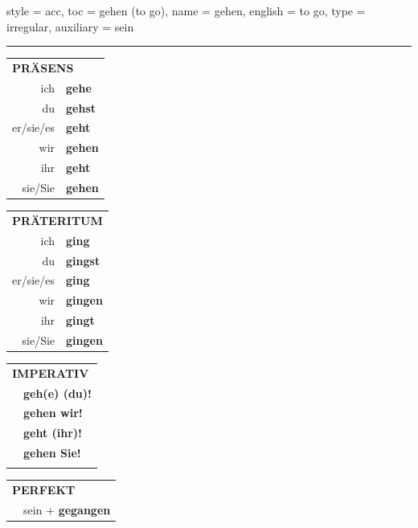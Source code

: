 \begin{verbentry}{
  style = {acc},
  toc = {gehen (to go)},
  name = {gehen},
  english = {to go},
  type = {irregular},
  auxiliary = {sein}
}
 
    
     \vspace{5pt}

    \hrule
    
    \vspace{5pt}

  \begin{tabular}{rl}
     \multicolumn{2}{l}{\textbf{PRÄSENS} }\\
    ich & \textbf{gehe}\\
    du & \textbf{gehst}\\
    er/sie/es & \textbf{geht}\\
    wir & \textbf{gehen}\\
    ihr & \textbf{geht}\\
    sie/Sie & \textbf{gehen}\\
  \end{tabular}
  \hfill
     \begin{tabular}{rl}
    \multicolumn{2}{l}{\textbf{PRÄTERITUM} }\\
    ich & \textbf{ging}\\
    du & \textbf{gingst}\\
    er/sie/es & \textbf{ging}\\
    wir & \textbf{gingen}\\
    ihr & \textbf{gingt}\\
    sie/Sie & \textbf{gingen}\\
  \end{tabular}
  \hfill
  \begin{tabular}{rl}
     \multicolumn{2}{l}{\textbf{IMPERATIV} }\\
   & \textbf{geh(e) (du)!}\\
   & \textbf{gehen wir!}\\
   & \textbf{geht (ihr)!}\\
   & \textbf{gehen Sie!}\\
   & \vspace{10pt}
  \end{tabular}

    \vspace{10pt}

 \begin{tabular}{rl}
     \multicolumn{2}{l}{\textbf{PERFEKT}}\\
   & sein + \textbf{gegangen}\\
  \end{tabular}
\hfill
   \begin{tabular}{rl}
   

\end{tabular}
\end{verbentry}
